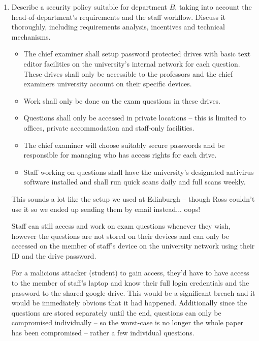 \documentclass[10pt,\jkfside,a4paper]{article}
\begin{document}
\begin{enumerate}
\begin{enumerate}
\begin{enumerate}[label=(\roman*)]
\item Describe a security policy suitable for department $B$, taking into account the 
head-of-department's requirements and the staff workflow. Discuss it thoroughly,
including requirements analysis, incentives and technical mechanisms.

\begin{itemize}

\item
The chief examiner shall setup password protected drives with basic text editor facilities
on the university's internal network for each question. These drives shall only be
accessible to the professors and the chief examiners university account on their
specific devices.

\item
Work shall only be done on the exam questions in these drives.

\item
Questions shall only be accessed in private locations -- this is limited to
offices, private accommodation and staff-only facilities.

\item
The chief examiner will choose suitably secure passwords and be responsible
for managing who has access rights for each drive.

\item
Staff working on questions shall have the university's designated antivirus
software installed and shall run quick scans daily and full scans weekly.

\end{itemize}

{\color{blue}
This sounds a lot like the setup we used at Edinburgh -- though Ross couldn't use it
so we ended up sending them by email instead... oops!
}

Staff can still access and work on exam questions whenever they wish, however
the questions are not stored on their devices and can only be accessed on the
member of staff's device on the university network using their ID and the drive
password.

For a malicious attacker (student) to gain access, they'd have to have access
to the member of staff's laptop and know their full login credentials and the
password to the shared google drive. This would be a significant breach and it
would be immediately obvious that it had happened.
Additionally since the questions are stored separately until the end, questions
can only be compromised individually -- so the worst-case is no longer the whole
paper has been compromised -- rather a few individual questions.


\end{enumerate}
\end{enumerate}
\end{enumerate}
\end{document}

